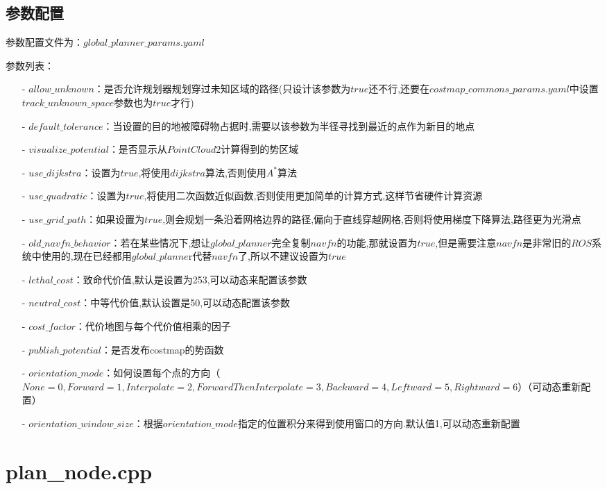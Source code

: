 \documentclass[9pt, oneside]{book}
\begin{document}
\subsection{参数配置}

参数配置文件为：$global\_planner\_params.yaml$

参数列表：

\begin{itemize}
    \item [-] $allow\_unknown$：是否允许规划器规划穿过未知区域的路径(只设计该参数为$true$还不行,还要在$costmap\_commons\_params.yaml$中设置$track\_unknown\_space$参数也为$true$才行)
    \item [-] $default\_tolerance$：当设置的目的地被障碍物占据时,需要以该参数为半径寻找到最近的点作为新目的地点
    \item [-] $visualize\_potential$：是否显示从$PointCloud2$计算得到的势区域
    \item [-] $use\_dijkstra$：设置为$true$,将使用$dijkstra$算法,否则使用$A^*$算法
    \item [-] $use\_quadratic$：设置为$true$,将使用二次函数近似函数,否则使用更加简单的计算方式,这样节省硬件计算资源
    \item [-] $use\_grid\_path$：如果设置为$true$,则会规划一条沿着网格边界的路径,偏向于直线穿越网格,否则将使用梯度下降算法,路径更为光滑点
    \item [-] $old\_navfn\_behavior$：若在某些情况下,想让$global\_planner$完全复制$navfn$的功能,那就设置为$true$,但是需要注意$navfn$是非常旧的$ROS$系统中使用的,现在已经都用$global\_planne$r代替$navfn$了,所以不建议设置为$true$
    \item [-] $lethal\_cost$：致命代价值,默认是设置为253,可以动态来配置该参数
    \item [-] $neutral\_cost$：中等代价值,默认设置是50,可以动态配置该参数
    \item [-] $cost\_factor$：代价地图与每个代价值相乘的因子
    \item [-] $publish\_potential$：是否发布costmap的势函数
    \item [-] $orientation\_mode$：如何设置每个点的方向（$None = 0,Forward = 1,Interpolate = 2,ForwardThenInterpolate = 3,Backward = 4,Leftward = 5,Rightward = 6$）（可动态重新配置）
    \item [-] $orientation\_window\_size$：根据$orientation\_mode$指定的位置积分来得到使用窗口的方向.默认值1,可以动态重新配置
\end{itemize}

\section{plan\_node.cpp}
\end{document}

